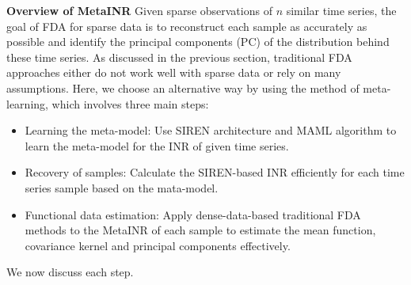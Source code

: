 \documentclass{article}
\begin{document}
\textbf{Overview of MetaINR}
Given sparse observations of $n$ similar time series, the goal of FDA for sparse data is to reconstruct each sample as accurately as possible and identify the principal components (PC) of the distribution behind these time series.
As discussed in the previous section, traditional FDA approaches either do not work well with sparse data or rely on many assumptions.
Here, we choose an alternative way by using the method of meta-learning, which involves three main steps:
\begin{itemize}
  \item Learning the meta-model: Use SIREN architecture and MAML algorithm to learn the meta-model for the INR of given time series.
  \item Recovery of samples: Calculate the SIREN-based INR efficiently for each time series sample based on the mata-model.
  \item Functional data estimation: Apply dense-data-based traditional FDA methods to the MetaINR of each sample to estimate the mean function, covariance kernel and principal components effectively.
\end{itemize}
We now discuss each step.
\end{document}

